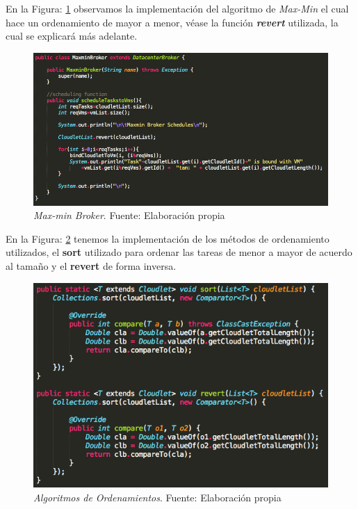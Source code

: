 En la Figura: \ref{fig:maxminBroker} observamos la implementación del algoritmo de \textit{Max-Min} el cual hace un ordenamiento de mayor a menor, véase la función \textbf{\textit{revert}} utilizada, la cual se explicará más adelante.

\renewcommand\thefigure{\arabic{figure}}
\begin{figure}[h!]
	\centering
	\includegraphics[scale=0.4]{media/maxmin_broker}
	\caption{\textit{Max-min Broker}. Fuente: Elaboración propia}
	\label{fig:maxminBroker}
\end{figure}

\newpage
En la Figura: \ref{fig:sortRevert} tenemos la implementación de los métodos de ordenamiento utilizados, el \textbf{sort} utilizado para ordenar las tareas de menor a mayor de acuerdo al tamaño y el \textbf{revert} de forma inversa.

\renewcommand\thefigure{\arabic{figure}}
\begin{figure}[h!]
	\centering
	\includegraphics[scale=0.5]{media/ordenamientos}
	\caption{\textit{Algoritmos de Ordenamientos}. Fuente: Elaboración propia}
	\label{fig:sortRevert}
\end{figure}

